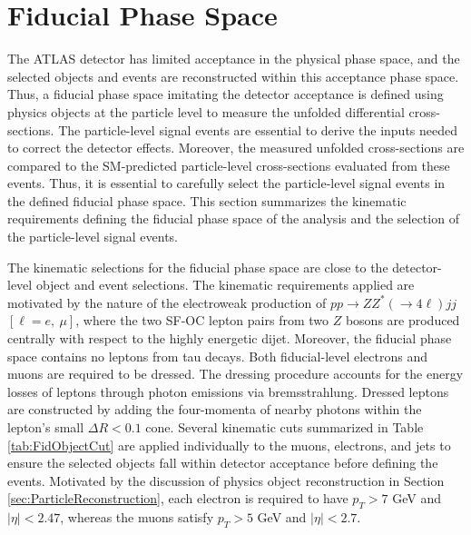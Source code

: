 \section{Fiducial Phase Space}
\label{sec:FidSel}

The ATLAS detector has limited acceptance in the physical phase space, and the selected objects and events are reconstructed within this acceptance phase space. Thus, a fiducial phase space imitating the detector acceptance is defined using physics objects at the particle level to measure the unfolded differential cross-sections. The particle-level signal events are essential to derive the inputs needed to correct the detector effects. Moreover, the measured unfolded cross-sections are compared to the SM-predicted particle-level cross-sections evaluated from these events. Thus, it is essential to carefully select the particle-level signal events in the defined fiducial phase space. This section summarizes the kinematic requirements defining the fiducial phase space of the analysis and the selection of the particle-level signal events. 

The kinematic selections for the fiducial phase space are close to the detector-level object and event selections. The kinematic requirements applied are motivated by the nature of the electroweak production of $pp\rightarrow ZZ^* ( \rightarrow 4\ell) jj$ $[\ell = e,~\mu]$, where the two SF-OC lepton pairs from two $Z$ bosons are produced centrally with respect to the highly energetic dijet. Moreover, the fiducial phase space contains no leptons from tau decays. Both fiducial-level electrons and muons are required to be dressed. The dressing procedure accounts for the energy losses of leptons through photon emissions via bremsstrahlung. Dressed leptons are constructed by adding the four-momenta of nearby photons within the lepton's small $\Delta R < 0.1$ cone. Several kinematic cuts summarized in Table \ref{tab:FidObjectCut} are applied individually to the muons, electrons, and jets to ensure the selected objects fall within detector acceptance before defining the events. Motivated by the discussion of physics object reconstruction in Section \ref{sec:ParticleReconstruction}, each electron is required to have $p_{T} > 7$ GeV and $|\eta| < 2.47$, whereas the muons satisfy $p_{T} > 5$ GeV and $|\eta| < 2.7$. 

